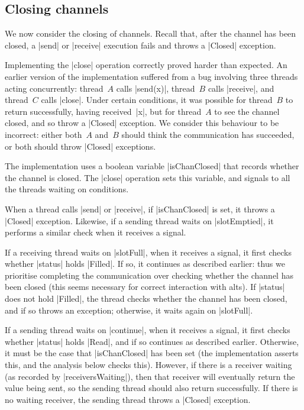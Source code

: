 \subsection{Closing channels}
\label{sec:syncchan-closing}

\inlineScala

We now consider the closing of channels.  Recall that, after the channel has
been closed, a |send| or |receive| execution fails and throws a |Closed|
exception.

Implementing the |close| operation correctly proved harder than expected.  An
earlier version of the implementation suffered from a bug involving three
threads acting concurrently: thread~$A$ calls |send(x)|, thread~$B$ calls
|receive|, and thread~$C$ calls |close|.  Under certain conditions, it was
possible for thread~$B$ to return successfully, having received~|x|, but for
thread~$A$ to see the channel closed, and so throw a |Closed| exception.  We
consider this behaviour to be incorrect: either both~$A$ and~$B$ should think
the communication has succeeded, or both should throw |Closed| exceptions.


The implementation uses a boolean variable |isChanClosed| that records whether
the channel is closed.  The |close| operation sets this variable, and signals
to all the threads waiting on conditions.

When a thread calls |send| or |receive|, if |isChanClosed| is set, it throws a
|Closed| exception.  Likewise, if a sending thread waits on |slotEmptied|, it
performs a similar check when it receives a signal.  

If a receiving thread waits on |slotFull|, when it receives a signal, it first
checks whether |status| holds |Filled|.  If so, it continues as described
earlier: thus we prioritise completing the communication over checking whether
the channel has been closed (this seems necessary for correct interaction with
alts).
If |status| does not hold |Filled|, the thread checks whether the channel has
been closed, and if so throws an exception; otherwise, it waits again on
|slotFull|.

If a sending thread waits on |continue|, when it receives a signal, it 
first checks whether |status| holds |Read|, and if so continues as described
earlier.  Otherwise, it must be the case that |isChanClosed| has been set (the
implementation asserts this, and the analysis below checks this).  However, if
there is a receiver waiting (as recorded by |receiversWaiting|), then that
receiver will eventually return the value being sent, so the sending thread
should also return successfully.  If there is no waiting receiver, the sending
thread throws a |Closed| exception.  

